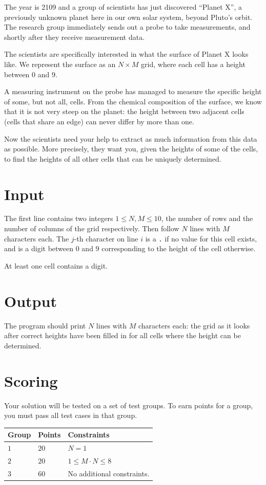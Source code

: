 The year is 2109 and a group of scientists has just discovered ``Planet X'',
a previously unknown planet here in our own solar system,
beyond Pluto's orbit. The research group immediately sends out
a probe to take measurements, and shortly after they receive measurement data.

The scientists are specifically interested in what the surface of Planet X looks like.
We represent the surface as an $N \times M$ grid, where each cell
has a height between $0$ and $9$.

A measuring instrument on the probe has managed to measure the specific height
of some, but not all, cells. From the chemical composition of the surface, we know that it is not
very steep on the planet: the height between two
adjacent cells (cells that share an edge) can never differ
by more than one.

Now the scientists need your help to extract as much information
from this data as possible. More precisely, they want you, given the heights
of some of the cells, to find the heights of all other cells that can be uniquely determined.

\section*{Input}
The first line contains two integers $1 \le N,M \le 10$,
the number of rows and the number of columns of the grid respectively.
Then follow $N$ lines with $M$ characters each.
The $j$-th character on line $i$ is a \texttt{.} if
no value for this cell exists, and is a digit between
$0$ and $9$ corresponding to the height of the cell otherwise.

At least one cell contains a digit.

\section*{Output}
The program should print $N$ lines with $M$ characters each:
the grid as it looks after
correct heights have been filled in for all cells where the height can be determined.

\section*{Scoring}
Your solution will be tested on a set of test groups.
To earn points for a group, you must pass all test cases in that group.

\noindent
\begin{tabular}{| l | l | l |}
  \hline
  \textbf{Group} & \textbf{Points} & \textbf{Constraints} \\ \hline
  $1$    & $20$        &  $N = 1$\\ \hline
  $2$    & $20$        &  $1 \leq M \cdot N \leq 8$\\ \hline
  $3$    & $60$        &  No additional constraints. \\ \hline
\end{tabular}
